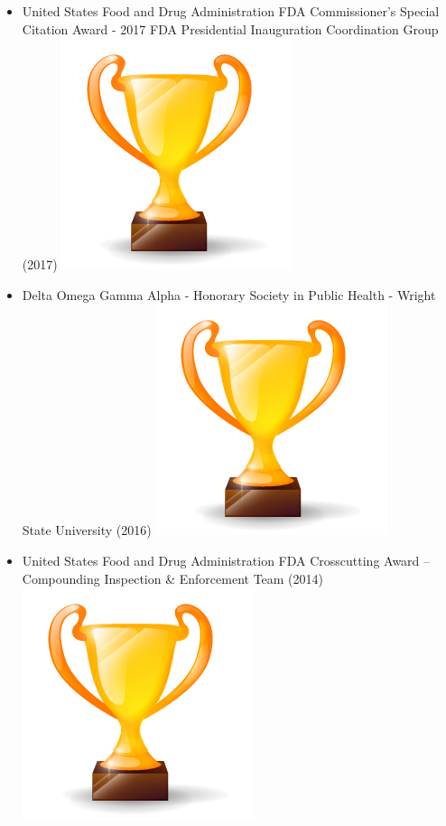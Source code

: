 \documentclass[letterpaper]{twentysecondcv} %
\begin{document}
{{\begin{itemize}
\item	United States Food and Drug Administration FDA Commissioner's Special Citation Award - 2017 FDA Presidential Inauguration Coordination Group (2017)	\includegraphics[scale=0.05]{img/trophy.png}
\item	Delta Omega Gamma Alpha - Honorary Society in Public Health - Wright State University (2016)	\includegraphics[scale=0.05]{img/trophy.png}
\item	United States Food and Drug Administration FDA Crosscutting Award – Compounding Inspection & Enforcement Team (2014)	\includegraphics[scale=0.05]{img/trophy.png}

\end{itemize}}}
\end{document}
